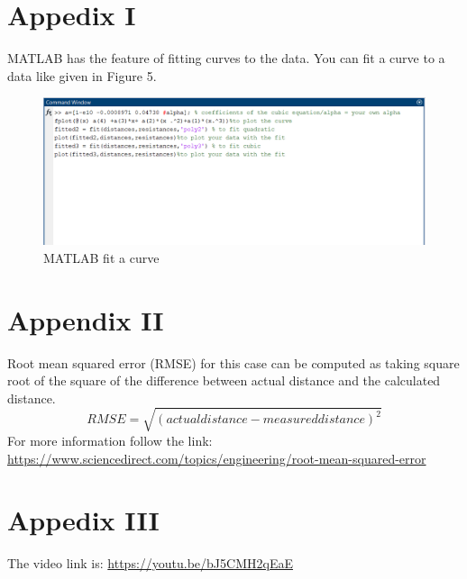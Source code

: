 \documentclass[letterpaper,12pt]{article}
\begin{document}
\section*{Appedix I}
MATLAB has the feature of fitting curves to the data. You can fit a curve to a data like given in Figure 5.
\begin{figure}[H]
	\centering
	\includegraphics[width=1\textwidth]{appendix.png}
	\caption{MATLAB fit a curve}
\end{figure}
\section*{Appendix II}
Root mean squared error (RMSE) for this case can be computed as taking square root of the square of the difference between actual distance and the calculated distance.
\[RMSE = \sqrt{(actualdistance - measureddistance)^2}\]
For more information follow the link: \url{https://www.sciencedirect.com/topics/engineering/root-mean-squared-error}
\section*{Appedix III}
The video link is: \url{https://youtu.be/bJ5CMH2qEaE}
\end{document}

